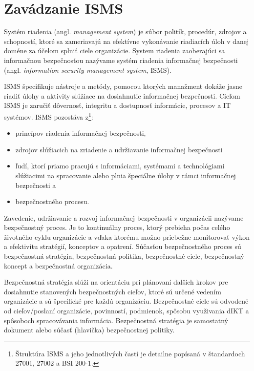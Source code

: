 \chapter{Zavádzanie ISMS} \label{chapter:isms}

Systém riadenia (angl. \textit{management system}) je súbor politík, procedúr, zdrojov a schopností, ktoré sa zameriavajú
na efektívne vykonávanie riadiacích úloh v danej doméne za účelom splniť ciele organizácie\cite{FITSM}. System riadenia
zaoberajúci sa informačnou bezpečnosťou nazývame systém riadenia informačnej bezpečnosti (angl. \textit{information
security management system}, ISMS).

ISMS špecifikuje nástroje a metódy, pomocou ktorých manažment dokáže jasne riadiť úlohy a aktivity slúžiace na dosiahnutie
informačnej bezpečnosti\cite{BSI1}. Cieľom ISMS je zaručiť dôvernosť, integritu a dostupnosť informácie, procesov a IT
systémov. ISMS pozostáva z\footnote{Štruktúra ISMS a jeho jednotlivých častí je detailne popísaná v štandardoch 27001,
27002 a BSI 200-1.}:

\begin{itemize}
  \item princípov riadenia informačnej bezpečnosti,
  \item zdrojov slúžiacich na zriadenie a udržiavanie informačnej bezpečnosti
  \item ľudí, ktorí priamo pracujú s informáciami, systémami a technológiami slúžiacimi na spracovanie alebo plnia špeciálne
    úlohy v rámci informačnej bezpečnosti a 
  \item bezpečnostného procesu.
\end{itemize}

Zavedenie, udržiavanie a rozvoj informačnej bezpečnosti v organizácii nazývame bezpečnostný proces. Je to kontinuálny proces,
ktorý prebieha počas celého životného cyklu organizácie a vďaka ktorému možno priebežne monitorovať výkon a efektivitu stratégií,
konceptov a opatrení. Súčasťou bezpečnostného proces sú bezpečnostná stratégia, bezpečnostná politika, bezpečnostné ciele,
bezpečnostný koncept a bezpečnostná organizácia.

Bezpečnostná stratégia slúži na orientáciu pri plánovaní ďalších krokov pre dosiahnutie stanovených bezpečnostných cieľov,
ktoré sú určené vedením organizácie a sú špecifické pre každú organizáciu. Bezpečnostné ciele sú odvodené od cieľov/poslaní
organizácie, povinností, podmienok, spôsobu využivania \acrshort{dIKT} a spôsoboch spracovávania informácia. Bezpečnostná
stratégia je samostatný dokument alebo súčasť (hlavička) bezpečnostnej politiky.

